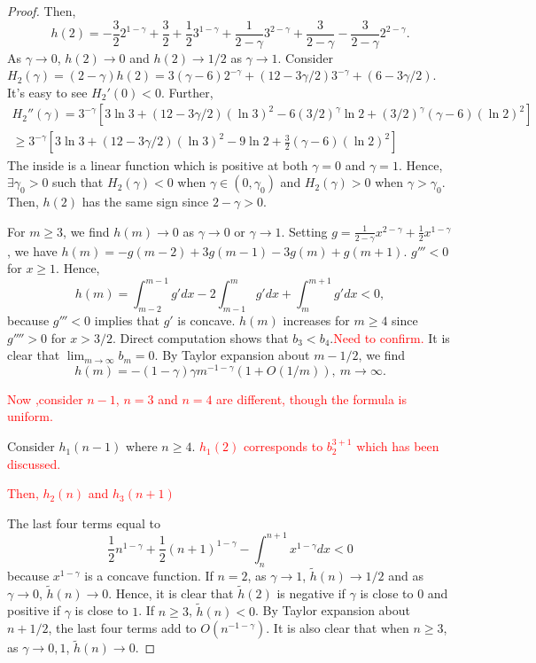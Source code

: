 \documentclass[11pt]{article}
\newcommand{\tcr}[1]{\textcolor{red}{#1}}
\begin{document}
\begin{proof}
Then, $$
h(2)=-\frac{3}{2}2^{1-\gamma}+\frac{3}{2}+\frac{1}{2}3^{1-\gamma}
+\frac{1}{2-\gamma}3^{2-\gamma}
+\frac{3}{2-\gamma}-\frac{3}{2-\gamma}2^{2-\gamma}.
$$
As $\gamma\to 0$, $h(2)\to 0$ and $h(2)\to 1/2$ as $\gamma\to 1$. 
Consider $H_2(\gamma)=(2-\gamma)h(2)=3(\gamma-6)2^{-\gamma}+(12-3\gamma/2)3^{-\gamma}
+(6-3\gamma/2)$. It's easy to see $H_2'(0)<0$. Further, 
\begin{multline*}
H_2''(\gamma)=3^{-\gamma}[3\ln 3+(12-3\gamma/2)(\ln 3)^2
-6(3/2)^{\gamma}\ln 2+(3/2)^{\gamma}(\gamma-6)(\ln 2)^2]\\
\ge 3^{-\gamma}[3\ln 3+(12-3\gamma/2)(\ln 3)^2
-9\ln 2+\frac{3}{2}(\gamma-6)(\ln 2)^2]
\end{multline*}
The inside is a linear function which is positive at both $\gamma=0$ and $\gamma=1$. Hence, $\exists \gamma_0>0$ such that $H_2(\gamma)<0$ when $\gamma\in(0,\gamma_0)$ and $H_2(\gamma)>0$ when $\gamma>\gamma_0$. Then, $h(2)$ has the same sign since $2-\gamma>0$.

For $m\ge 3$, we find $h(m)\to 0$ as $\gamma\to 0$ or $\gamma\to 1$. Setting $g=\frac{1}{2-\gamma}x^{2-\gamma}+\frac{1}{2}x^{1-\gamma}$, we have
$h(m)=-g(m-2)+3g(m-1)-3g(m)+g(m+1)$. $g'''<0$ for $x\ge 1$. Hence, $$
h(m)=\int_{m-2}^{m-1}g' dx-2\int_{m-1}^{m}g' dx
+\int_{m}^{m+1}g' dx<0,
$$
because $g'''<0$ implies that $g'$ is concave. $h(m)$ increases for $m\ge 4$ since $g''''>0$ for $x>3/2$. 
Direct computation shows that $b_3<b_4$.\tcr{Need to confirm.}
It is clear that $\lim_{m\to\infty}b_m=0$. By Taylor expansion about $m-1/2$, we find $$
h(m)=-(1-\gamma)\gamma m^{-1-\gamma}(1+O(1/m)),\ m\to\infty.
$$

\tcr{Now ,consider $n-1$, $n=3$ and $n=4$ are different, though the formula is uniform.}

Consider $h_1(n-1)$ where $n\ge 4$. \tcr{$h_1(2)$ corresponds to $b_2^{3+1}$ which has been discussed.}


\tcr{Then, $h_2(n)$ and $h_3(n+1)$}

The last four terms equal to $$
\frac{1}{2}n^{1-\gamma}+\frac{1}{2}(n+1)^{1-\gamma}
-\int_n^{n+1}x^{1-\gamma}dx<0
$$
because $x^{1-\gamma}$ is a concave function. 
If $n=2$, as $\gamma\to 1$, $\tilde{h}(n)\to 1/2$ and as $\gamma\to 0$, $\tilde{h}(n)\to 0$. Hence, it is clear that $\tilde{h}(2)$ is negative if $\gamma$ is close to $0$ and positive if $\gamma$ is close to $1$. 
If $n\ge 3$, $\tilde{h}(n)<0$. By Taylor expansion about $n+1/2$, the last four terms add to $O(n^{-1-\gamma})$. It is also clear that when $n\ge 3$, as $\gamma\to 0,1$, $\tilde{h}(n)\to 0$. 


\end{proof}
\end{document}
